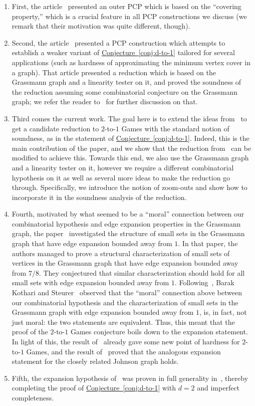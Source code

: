 \documentclass[11pt]{article}
\numberwithin{equation}{section}
\theoremstyle{definition}
\theoremstyle{plain}
\newcommand{\expref}[2]{\hyperref[#2]{#1~\ref{#2}}}
\begin{document}
\begin{enumerate}
\item First, the %
article~\cite{KS}  %
presented an outer PCP which is based on the ``covering property,'' which is a crucial feature in all PCP constructions we discuss (we remark that their motivation was quite different, though).
\item Second, the %
article~\cite{KMS}
presented a PCP
construction which attempts to establish a weaker variant of \expref{Conjecture}{conj:d-to-1} tailored for several applications
(such as hardness of approximating the minimum vertex cover in a graph). That
%
article  %
presented a reduction which is based on the
Grassmann graph and a linearity tester on it, and proved the soundness of the reduction assuming some combinatorial conjecture on the Grassmann graph; we refer the reader to~\cite{KMS} for further discussion on that.
  \item Third comes the current work. The goal here is to extend the ideas from~\cite{KMS} to get a candidate reduction to $2$-to-$1$ Games
  with the standard notion of soundness, as in the statement of \expref{Conjecture}{conj:d-to-1}. Indeed, this is the main contribution of the
  paper, and we show that the reduction from~\cite{KMS} can be modified to achieve this. Towards this end, we also use the Grassmann graph
  and a linearity tester on it, however we require a different combinatorial hypothesis on it as well as several more ideas to make the
  reduction go through. Specifically, we introduce the notion of zoom-outs and show how to incorporate it in the soundness analysis of
  the reduction.
  \item Fourth, motivated by what seemed to be a ``moral'' connection between our combinatorial hypothesis and edge expansion properties in
  the Grassmann graph, the %
paper~\cite{DKKMS1}
investigated the structure of small sets in the Grassmann graph that have edge expansion
bounded away from $1$. In that %
paper, %
the authors managed to prove a structural characterization of small sets of vertices in the
  Grassmann graph that have edge expansion %
bounded away from $7/8$. They conjectured that similar characterization should hold for all
  small sets with edge expansion bounded away from $1$. Following~\cite{DKKMS1}, Barak Kothari and Steurer~\cite{BKS} observed that the ``moral''
  connection above between our combinatorial hypothesis and the characterization of small sets in the Grassmann
graph  %
  with edge expansion bounded
  away from $1$, is, in fact, not just moral: the two statements are equivalent.
  Thus, this meant that the proof of the $2$-to-$1$ Games conjecture boils down to the expansion
  statement. In light of this, the result of~\cite{DKKMS1} already gave some new point of hardness for $2$-to-$1$ Games, and the result of~\cite{KMMS} proved that the analogous expansion statement for the closely related Johnson graph holds.
  \item Fifth, the expansion hypothesis of~\cite{DKKMS1} was proven in full generality in~\cite{KMS2}, thereby completing the
  proof of \expref{Conjecture}{conj:d-to-1} with $d=2$ and imperfect completeness.
\end{enumerate}
\end{document}
